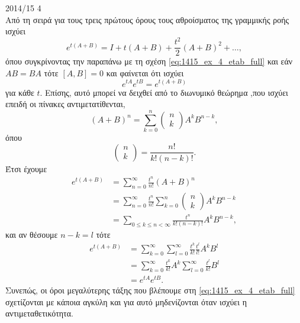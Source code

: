\documentclass[a4paper,11pt]{article}
\begin{document}
\begin{solution}{2014/15 4}
\begin{equation*}
    \end{equation*}
    Από τη σειρά  για τους τρεις πρώτους όρους τους αθροίσματος της
    γραμμικής ροής ισχύει
    \begin{equation*}
        e^{t(A + B)} = I + t(A + B) + \frac{t^2}{2}(A + B)^2 + \dots,
    \end{equation*}
    όπου συγκρίνοντας την παραπάνω με τη σχέση
    \eqref{eq:1415_ex_4_etab_full} και εάν
    \( AB=BA \) τότε \( [A,B] = 0 \) και φαίνεται ότι ισχύει
    \begin{equation*}
        e^{tA}e^{tB} = e^{t(A + B)}
    \end{equation*}
    για κάθε \( t \). Επίσης, αυτό μπορεί να δειχθεί από το διωνυμικό θεώρημα
    ,που ισχύει επειδή οι πίνακες αντιμετατίθενται,
    \begin{equation*}
        (A + B)^n = \sum_{k=0}^n \begin{pmatrix}n\\k\end{pmatrix}A^kB^{n-k},
    \end{equation*}
    όπου
    \begin{equation*}
        \begin{pmatrix}n\\k\end{pmatrix} = \dfrac{n!}{k!(n - k)!}.
    \end{equation*}
    Έτσι έχουμε
    \begin{align*}
        e^{t(A+B)} &= \sum_{n=0}^{\infty}\frac{t^n}{n!}(A+B)^n\\
        &= \sum_{n=0}^{\infty}\frac{t^n}{n!}\sum_{k=0}^n\begin{pmatrix}n\\k\end{pmatrix}A^kB^{n-k}\\
        &=\sum_{0 \leq k \leq n < \infty}\frac{t^n}{k!(n - k)!}A^kB^{n-k},
    \end{align*}
    και αν θέσουμε \( n - k = l\) τότε
    \begin{align*}
        e^{t(A+B)} &=\sum_{k=0}^{\infty}\sum_{l=0}^{\infty}
        \frac{t^k}{k!}\frac{t^l}{l!}A^k B^{l} \\
        &=\sum_{k=0}^{\infty}\frac{t^k}{k!}A^k
        \sum_{l=0}^{\infty}\frac{t^l}{k!}B^{l} \\
        &=e^{tA}e^{tB}.
    \end{align*}
    Συνεπώς, οι όροι μεγαλύτερης τάξης που βλέπουμε στη
    \eqref{eq:1415_ex_4_etab_full} σχετίζονται με κάποια αγκύλη  και για
    αυτό μηδενίζονται όταν ισχύει η αντιμεταθετικότητα.
\end{solution}
\end{document}
